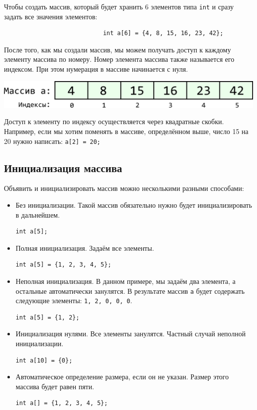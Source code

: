 \documentclass[10pt]{article}
\begin{document}
\noindent Чтобы создать массив, который будет хранить 6 элементов типа \texttt{int} и сразу задать все значения элементов:
\begin{lstlisting}
                            int a[6] = {4, 8, 15, 16, 23, 42};
\end{lstlisting}

После того, как мы создали массив, мы можем получать доступ к каждому элементу массива по номеру. Номер элемента массива также называется его индексом. При этом нумерация в массиве начинается с нуля.
\begin{center}
\includegraphics[scale=0.8]{../images/array_indexes.png}
\end{center}
Доступ к элементу по индексу осуществляется через квадратные скобки. Например, если мы хотим поменять в массиве, определённом выше, число 15 на 20 нужно написать: \texttt{a[2] = 20;}


\subsection*{Инициализация массива}
Объявить и инициализировать массив можно несколькими разными способами:
\begin{itemize}
\item Без инициализации. Такой массив обязательно нужно будет инициализировать в дальнейшем.
\begin{lstlisting}
int a[5]; 
\end{lstlisting}

\item Полная инициализация. Задаём все элементы.
\begin{lstlisting}
int a[5] = {1, 2, 3, 4, 5};
\end{lstlisting}

\item Неполная инициализация. В данном примере, мы задаём два элемента, а остальные автоматически занулятся. В результате массив \texttt{a} будет содержать следующие элементы: \texttt{1, 2, 0, 0, 0}. 
\begin{lstlisting}
int a[5] = {1, 2};
\end{lstlisting}

\item Инициализация нулями. Все элементы занулятся. Частный случай неполной инициализации.
\begin{lstlisting}
int a[10] = {0};
\end{lstlisting}

\item Автоматическое определение размера, если он не указан. Размер этого массива будет равен пяти.
\begin{lstlisting}
int a[] = {1, 2, 3, 4, 5};
\end{lstlisting}
\end{itemize}
\end{document}
